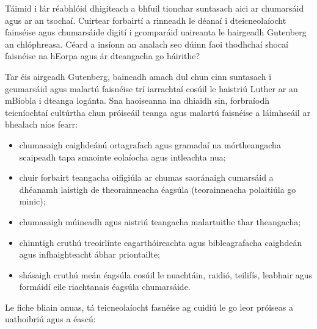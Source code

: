 \clearpage



\begin{multicols}{2}

Táimid i lár réabhlóid dhigiteach a bhfuil tionchar suntasach aici ar chumarsáid agus ar an tsochaí. Cuirtear forbairtí a rinneadh le déanaí i dteicneolaíocht fainséise agus chumarsáide digití i gcomparáid uaireanta le hairgeadh Gutenberg an chlóphreasa. Céard a insíonn an analach seo dúinn faoi thodhchaí shocaí faisnéise na hEorpa agus ár dteangacha go háirithe?


Tar éis airgeadh Gutenberg, baineadh amach dul chun cinn suntasach i gcumarsáid agus malartú faisnéise trí iarrachtaí cosúil le haistriú Luther ar an mBíobla i dteanga logánta. Sna haoiseanna ina dhiaidh sin, forbraíodh teicníochtaí cultúrtha chun próiseáil teanga agus malartú faisnéise a láimhseáil ar bhealach níos fearr:

\begin{itemize}
\item chumasaigh caighdeánú ortagrafach agus gramadaí na mórtheangacha scaipeadh tapa smaointe eolaíocha agus intleachta nua;
\item chuir forbairt teangacha oifigiúla ar chumas saoránaigh cumarsáid a dhéanamh laistigh de theorainneacha éagsúla (teorainneacha polaitiúla go minic);
\item chumasaigh múineadh agus aistriú teangacha malartuithe thar theangacha;
\item chinntigh cruthú treoirlínte eagarthóireachta agus bibleagrafacha caighdeán agus infhaighteacht ábhar priontailte;
\item shásaigh cruthú meán éagsúla cosúil le nuachtáin, raidió, teilifís, leabhair agus formáidí eile riachtanais éagsúla chumarsáide.
\end{itemize}

Le fiche bliain anuas, tá teicneolaíocht fasnéise ag cuidiú le go leor próiseas a uathoibriú agus a éascú:


\end{multicols}
